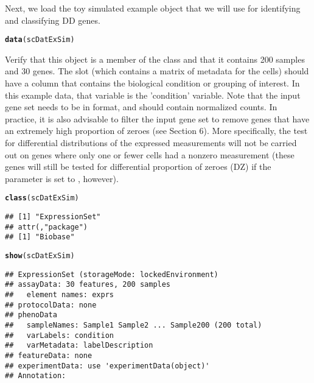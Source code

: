 \documentclass{article}\usepackage[]{graphicx}\usepackage[]{color}
\makeatletter
\newcommand{\hlstd}[1]{\textcolor[rgb]{0.345,0.345,0.345}{#1}}%
\newcommand{\hlkwd}[1]{\textcolor[rgb]{0.737,0.353,0.396}{\textbf{#1}}}%
\newenvironment{kframe}{%
 \def\at@end@of@kframe{}%
 \ifinner\ifhmode%
  \def\at@end@of@kframe{\end{minipage}}%
  \begin{minipage}{\columnwidth}%
 \fi\fi%
 \def\FrameCommand##1{\hskip\@totalleftmargin \hskip-\fboxsep
 \colorbox{shadecolor}{##1}\hskip-\fboxsep
     \hskip-\linewidth \hskip-\@totalleftmargin \hskip\columnwidth}%
 \MakeFramed {\advance\hsize-\width
   \@totalleftmargin\z@ \linewidth\hsize
   \@setminipage}}%
 {\par\unskip\endMakeFramed%
 \at@end@of@kframe}
\newenvironment{knitrout}{}{} %
\makeatother
\begin{document}
Next, we load the toy simulated example  object that we will use for identifying and classifying DD genes.
\begin{knitrout}
\color{fgcolor}\begin{kframe}
\begin{alltt}
\hlkwd{data}\hlstd{(scDatExSim)}
\end{alltt}
\end{kframe}
\end{knitrout}

Verify that this object is a member of the  class and that it contains 200 samples and 30 genes.  The  slot (which contains a matrix of metadata for the cells) should have a column that contains the biological condition or grouping of interest.  In this example data, that variable is the 'condition' variable.  Note that the input gene set needs to be in  format, and should contain normalized counts.  In practice, it is also advisable to filter the input gene set to remove genes that have an extremely high proportion of zeroes (see Section 6).  More specifically, the test for differential distributions of the expressed measurements will not be carried out on genes where only one or fewer cells had a nonzero measurement (these genes will still be tested for differential proportion of zeroes (DZ) if the  parameter is set to , however).
\begin{knitrout}
\color{fgcolor}\begin{kframe}
\begin{alltt}
\hlkwd{class}\hlstd{(scDatExSim)}
\end{alltt}
\begin{verbatim}
## [1] "ExpressionSet"
## attr(,"package")
## [1] "Biobase"
\end{verbatim}
\begin{alltt}
\hlkwd{show}\hlstd{(scDatExSim)}
\end{alltt}
\begin{verbatim}
## ExpressionSet (storageMode: lockedEnvironment)
## assayData: 30 features, 200 samples 
##   element names: exprs 
## protocolData: none
## phenoData
##   sampleNames: Sample1 Sample2 ... Sample200 (200 total)
##   varLabels: condition
##   varMetadata: labelDescription
## featureData: none
## experimentData: use 'experimentData(object)'
## Annotation:
\end{verbatim}
\end{kframe}
\end{knitrout}
\end{document}
